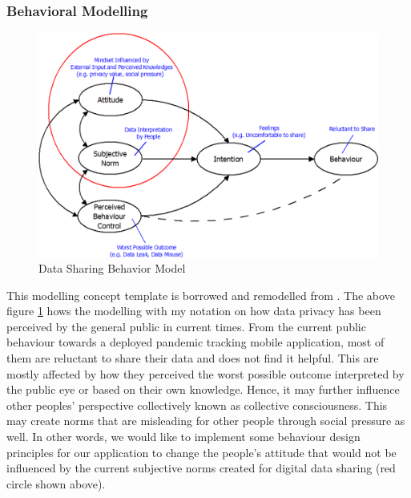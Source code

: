     \subsubsection{Behavioral Modelling}
      \begin{figure}[H]
        \centering
        \includegraphics[scale=1]{img/digital-prototype/behavior-model.png}
        \caption{Data Sharing Behavior Model}
        \label{fig:behavior-model}
      \end{figure}
      \par This modelling concept template is borrowed and remodelled from \parencite{Ian8}. The above figure \ref{fig:behavior-model} hows the
      modelling with my notation on how data privacy has been perceived by the general public in current
      times. From the current public behaviour towards a deployed pandemic tracking mobile application,
      most of them are reluctant to share their data and does not find it helpful. This are mostly affected by
      how they perceived the worst possible outcome interpreted by the public eye or based on their own
      knowledge. Hence, it may further influence other peoples' perspective collectively known as
      collective consciousness. This may create norms that are misleading for other people through social
      pressure as well. In other words, we would like to implement some behaviour design principles for
      our application to change the people's attitude that would not be influenced by the current subjective
      norms created for digital data sharing (red circle shown above).
    

